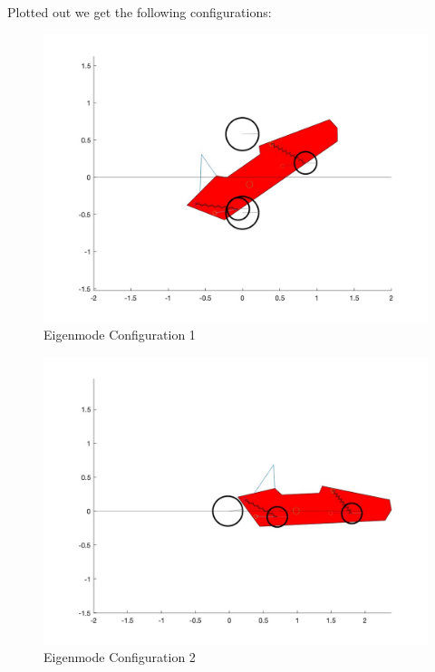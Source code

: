 Plotted out we get the following configurations:

\begin{figure}[ht]
    \centering
    \includegraphics[scale=0.235]{images/mode1.jpg}
    \caption{Eigenmode Configuration 1}
    \label{fig:mode_1}
\end{figure}

\begin{figure}[ht]
    \centering
    \includegraphics[scale=0.235]{images/mode2.jpg}
    \caption{Eigenmode Configuration 2}
    \label{fig:mode_2}
\end{figure}

